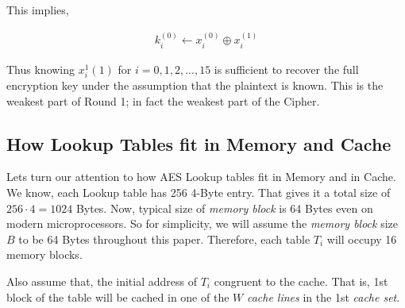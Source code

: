 
\begin{flushleft}
This implies,
\end{flushleft}
\begin{align*}
k_i^{(0)} \gets x_i^{(0)} \oplus x_i^{(1)}
\end{align*}

\begin{flushleft}
Thus knowing $x_i^1{(1)}$ for $i=0,1,2,...,15$ is sufficient to recover the full encryption key under the assumption that the plaintext is known. This is the weakest part of Round 1; in fact the weakest part of the Cipher.
\end{flushleft}

\subsection{How Lookup Tables fit in Memory and Cache}

Lets turn our attention to how AES Lookup tables fit in Memory and in Cache. We know, each Lookup table has 256 4-Byte entry. That gives it a total size of $256 \cdot 4=1024$ Bytes. Now, typical size of \emph{memory block} is 64 Bytes even on modern microprocessors. So for simplicity, we will assume the \emph{memory block} size $B$ to be 64 Bytes throughout this paper. Therefore, each table $T_i$ will occupy 16 memory blocks.

\begin{flushleft}
Also assume that, the initial address of $T_i$ congruent to the cache. That is, 1st block of the table will be cached in one of the $W$ \emph{cache lines} in the 1st \emph{cache set}.
\end{flushleft}
